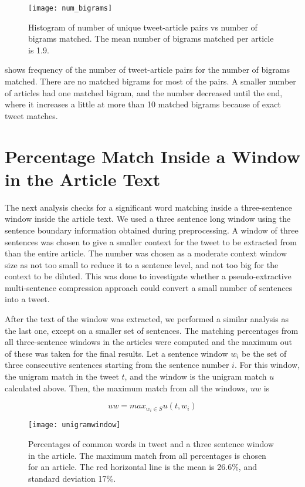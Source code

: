 \begin{figure}[!htbp]
\centering
\texttt{[image: num\_bigrams]}
\caption[Histogram for number of matched bigrams.]{Histogram of number of unique tweet-article pairs vs number of bigrams matched. The mean number of bigrams matched per article is 1.9.}
\label{fig:num_bigrams}
\end{figure}

 shows frequency of the number of tweet-article pairs for the number of bigrams matched. There are no matched bigrams for most of the pairs. A smaller number of articles had one matched bigram, and the number decreased until the end, where it increases a little at more than 10 matched bigrams because of exact tweet matches. 


\section{Percentage Match Inside a Window in the Article Text}
\label{sec:window}

The next analysis checks for a significant word matching inside a three-sentence window inside the article text. We used a three sentence long window using the sentence boundary information obtained during preprocessing. A window of three sentences was chosen to give a smaller context for the tweet to be extracted from than the entire article. The number was chosen as a moderate context window size as not too small to reduce it to a sentence level, and not too big for the context to be diluted. This was done to investigate whether a pseudo-extractive multi-sentence compression approach could convert a small number of sentences into a tweet.

After the text of the window was extracted, we performed a similar analysis as the last one, except on a smaller set of sentences. The matching percentages from all three-sentence windows in the articles were computed and the maximum out of these was taken for the final results. Let a sentence window $w_i$ be the set of three consecutive sentences starting from the sentence number $i$. For this window, the unigram match in the tweet $t$, and the window is the unigram match $u$ calculated above. Then, the maximum match from all the windows, $uw$ is 

\begin{equation}
uw = max_{w_i \in S} u(t, w_i)
\end{equation}

\begin{figure}[!htbp]
\centering
\texttt{[image: unigramwindow]}
\caption[Match percentages in tweet against window in article]{Percentages of common words in tweet and a three sentence window in the article. The maximum match from all percentages is chosen for an article. The red horizontal line is the mean is 26.6\%, and standard deviation 17\%.}
\label{fig:unigramwindow}
\end{figure}

